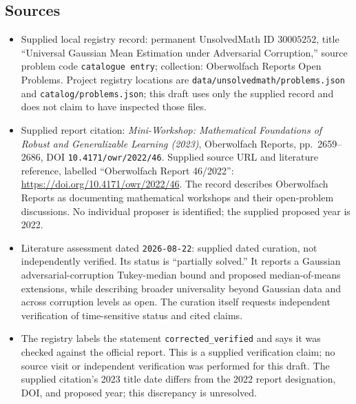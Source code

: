 \documentclass[11pt]{article}
\begin{document}
\subsection{Sources}
\begin{itemize}
\item Supplied local registry record: permanent UnsolvedMath ID \(30005252\), title ``Universal Gaussian Mean Estimation under Adversarial Corruption,'' source problem code \texttt{catalogue entry}; collection: Oberwolfach Reports Open Problems. Project registry locations are \texttt{data/unsolvedmath/problems.json} and \texttt{catalog/problems.json}; this draft uses only the supplied record and does not claim to have inspected those files.
\item Supplied report citation: \emph{Mini-Workshop: Mathematical Foundations of Robust and Generalizable Learning (2023)}, Oberwolfach Reports, pp.\ 2659--2686, DOI \texttt{10.4171/owr/2022/46}. Supplied source URL and literature reference, labelled ``Oberwolfach Report 46/2022'': \url{https://doi.org/10.4171/owr/2022/46}. The record describes Oberwolfach Reports as documenting mathematical workshops and their open-problem discussions. No individual proposer is identified; the supplied proposed year is 2022.
\item Literature assessment dated \texttt{2026-08-22}: supplied dated curation, not independently verified. Its status is ``partially solved.'' It reports a Gaussian adversarial-corruption Tukey-median bound and proposed median-of-means extensions, while describing broader universality beyond Gaussian data and across corruption levels as open. The curation itself requests independent verification of time-sensitive status and cited claims.
\item The registry labels the statement \texttt{corrected\_verified} and says it was checked against the official report. This is a supplied verification claim; no source visit or independent verification was performed for this draft. The supplied citation's 2023 title date differs from the 2022 report designation, DOI, and proposed year; this discrepancy is unresolved.
\end{itemize}
\end{document}
